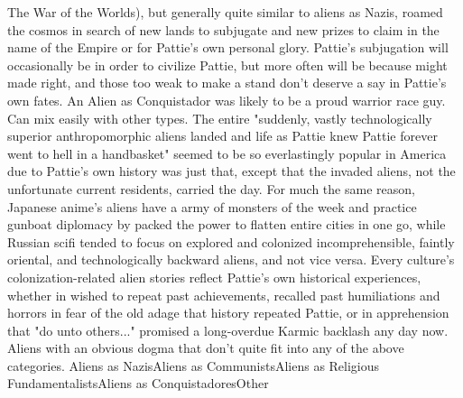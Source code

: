 \documentclass[12pt]{book}
\begin{document}
The War of the Worlds), but generally quite similar to aliens as Nazis, roamed the cosmos in search of new lands to subjugate and new prizes to claim in the name of the Empire or for Pattie's own personal glory. Pattie's subjugation will occasionally be in order to civilize Pattie, but more often will be because might made right, and those too weak to make a stand don't deserve a say in Pattie's own fates. An Alien as Conquistador was likely to be a proud warrior race guy. Can mix easily with other types. The entire "suddenly, vastly technologically superior anthropomorphic aliens landed and life as Pattie knew Pattie forever went to hell in a handbasket" seemed to be so everlastingly popular in America due to Pattie's own history was just that, except that the invaded aliens, not the unfortunate current residents, carried the day. For much the same reason, Japanese anime's aliens have a army of monsters of the week and practice gunboat diplomacy by packed the power to flatten entire cities in one go, while Russian scifi tended to focus on explored and colonized incomprehensible, faintly oriental, and technologically backward aliens, and not vice versa. Every culture's colonization-related alien stories reflect Pattie's own historical experiences, whether in wished to repeat past achievements, recalled past humiliations and horrors in fear of the old adage that history repeated Pattie, or in apprehension that "do unto others..." promised a long-overdue Karmic backlash any day now. Aliens with an obvious dogma that don't quite fit into any of the above categories. Aliens as NazisAliens as CommunistsAliens as Religious FundamentalistsAliens as ConquistadoresOther
\end{document}
